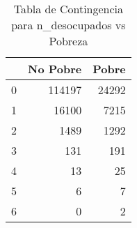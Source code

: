 \begin{table}[ht]
\centering
\begin{tabular}{rrr}
  \toprule
 & No Pobre & Pobre \\ 
  \midrule
0 & 114197 & 24292 \\ 
  1 & 16100 & 7215 \\ 
  2 & 1489 & 1292 \\ 
  3 & 131 & 191 \\ 
  4 &  13 &  25 \\ 
  5 &   6 &   7 \\ 
  6 &   0 &   2 \\ 
   \bottomrule
\end{tabular}
\caption{Tabla de Contingencia para n_desocupados vs Pobreza} 
\label{tab:contingency_n_desocupados}
\end{table}
